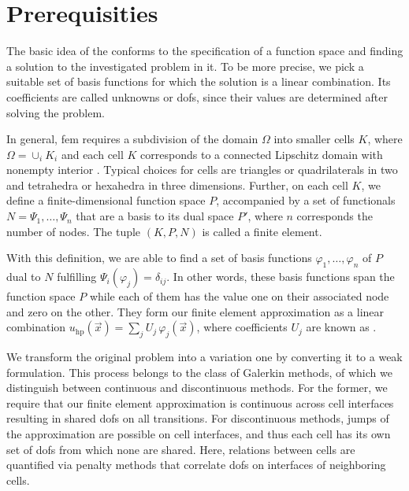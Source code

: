 \section{Prerequisities}
\label{sec:prerequisities}


The basic idea of the  conforms to the specification of a function space and finding a solution to the investigated problem in it. To be more precise, we pick a suitable set of basis functions for which the solution is a linear combination. Its coefficients are called unknowns or \glspl{dof}, since their values are determined after solving the problem.

In general, \gls{fem} requires a subdivision of the domain $\Omega$ into smaller cells $K$, where $\Omega = \cup_{i} K_i$ and each cell $K$ corresponds to a connected Lipschitz domain with nonempty interior . Typical choices for cells are triangles or quadrilaterals in two and tetrahedra or hexahedra in three dimensions.
Further, on each cell $K$, we define a finite-dimensional function space $P$, accompanied by a set of functionals $N = {\Psi_1, \dots, \Psi_n}$ that are a basis to its dual space $P'$, where $n$ corresponds the number of nodes. The tuple $(K,P,N)$ is called a finite element. 

With this definition, we are able to find a set of basis functions ${\varphi_1, \dots, \varphi_n}$ of $P$ dual to $N$ fulfilling $\Psi_i(\varphi_j) = \delta_{ij}$. In other words, these basis functions span the function space $P$ while each of them has the value one on their associated node and zero on the other. They form our finite element approximation as a linear combination $u_{\text{hp}}(\vec{x}) = \sum_{j} U_j \, \varphi_j(\vec{x})$, where coefficients $U_j$ are known as .

We transform the original problem into a variation one by converting it to a weak formulation. This process belongs to the class of Galerkin methods, of which we distinguish between continuous and discontinuous methods. For the former, we require that our finite element approximation is continuous across cell interfaces resulting in shared \glspl{dof} on all transitions. For discontinuous methods, jumps of the approximation are possible on cell interfaces, and thus each cell has its own set of \glspl{dof} from which none are shared. Here, relations between cells are quantified via penalty methods that correlate \glspl{dof} on interfaces of neighboring cells.

